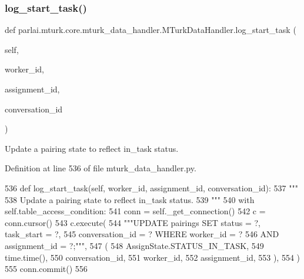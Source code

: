 \subsubsection{\texorpdfstring{log\+\_\+start\+\_\+task()}{log\_start\_task()}}
{\footnotesize\ttfamily def parlai.\+mturk.\+core.\+mturk\+\_\+data\+\_\+handler.\+M\+Turk\+Data\+Handler.\+log\+\_\+start\+\_\+task (\begin{DoxyParamCaption}\item[{}]{self,  }\item[{}]{worker\+\_\+id,  }\item[{}]{assignment\+\_\+id,  }\item[{}]{conversation\+\_\+id }\end{DoxyParamCaption})}

\begin{DoxyVerb}Update a pairing state to reflect in_task status.
\end{DoxyVerb}
 

Definition at line 536 of file mturk\+\_\+data\+\_\+handler.\+py.


\begin{DoxyCode}
536     \textcolor{keyword}{def }log\_start\_task(self, worker\_id, assignment\_id, conversation\_id):
537         \textcolor{stringliteral}{"""}
538 \textcolor{stringliteral}{        Update a pairing state to reflect in\_task status.}
539 \textcolor{stringliteral}{        """}
540         with self.table\_access\_condition:
541             conn = self.\_get\_connection()
542             c = conn.cursor()
543             c.execute(
544                 \textcolor{stringliteral}{"""UPDATE pairings SET status = ?, task\_start = ?,}
545 \textcolor{stringliteral}{                         conversation\_id = ? WHERE worker\_id = ?}
546 \textcolor{stringliteral}{                         AND assignment\_id = ?;"""},
547                 (
548                     AssignState.STATUS\_IN\_TASK,
549                     time.time(),
550                     conversation\_id,
551                     worker\_id,
552                     assignment\_id,
553                 ),
554             )
555             conn.commit()
556 
\end{DoxyCode}
\mbox{\label{classparlai_1_1mturk_1_1core_1_1mturk__data__handler_1_1MTurkDataHandler_a2cebff3c6da14d643bd2bfedce73ba4a}} 
